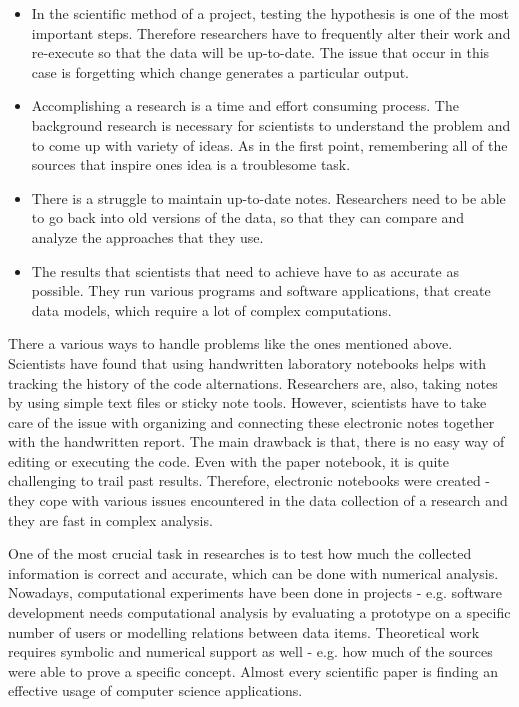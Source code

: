 \begin{itemize}
\item In the scientific method of a project, testing the hypothesis is one of the most important steps. Therefore researchers have to frequently alter their work and re-execute so that the data will be up-to-date. The issue that occur in this case is forgetting which change generates a particular output. 

\item Accomplishing a research is a time and effort consuming process. The background research is necessary for scientists to understand the problem and to come up with variety of ideas. As in the first point, remembering all of the sources that inspire ones idea is a troublesome task. 

\item There is a struggle to maintain up-to-date notes. Researchers need to be able to go back into old versions of the data, so that they can compare and analyze the approaches that they use. 

\item The results that scientists that need to achieve have to as accurate as possible. They run various programs and software applications, that create data models, which require a lot of complex computations.

\end{itemize}

There a various ways to handle problems like the ones mentioned above. Scientists have found that using handwritten laboratory notebooks helps with tracking the history of the code alternations. Researchers are, also, taking notes by using simple text files or sticky note tools. However, scientists have to take care of the issue with organizing and connecting these electronic notes together with the handwritten report. The main drawback is that, there is no easy way of editing or executing the code. Even with the paper notebook, it is quite challenging to trail past results. Therefore, electronic notebooks were created - they cope with various issues encountered in the data collection of a research and they are fast in complex analysis.

One of the most crucial task in researches is to test how much the collected information is correct and accurate, which can be done with numerical analysis. Nowadays, computational experiments have been done in projects - e.g. software development needs computational analysis by evaluating a prototype on a specific number of users or modelling relations between data items. Theoretical work requires symbolic and numerical support as well - e.g. how much of the sources were able to prove a specific concept. Almost every scientific paper is finding an effective usage of computer science applications.



